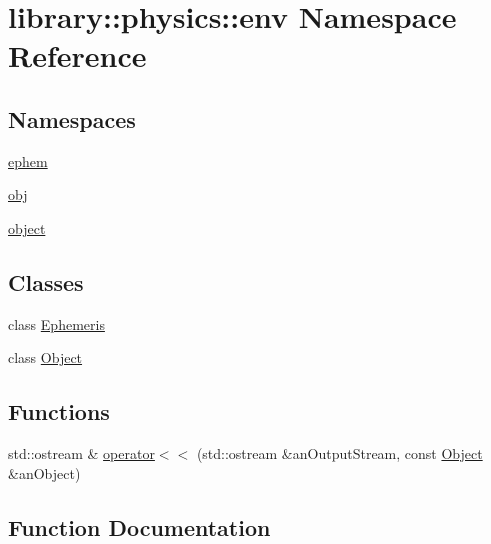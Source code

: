 \hypertarget{namespacelibrary_1_1physics_1_1env}{}\section{library\+:\+:physics\+:\+:env Namespace Reference}
\label{namespacelibrary_1_1physics_1_1env}
\subsection*{Namespaces}
\begin{DoxyCompactItemize}
\item 
 \hyperlink{namespacelibrary_1_1physics_1_1env_1_1ephem}{ephem}
\item 
 \hyperlink{namespacelibrary_1_1physics_1_1env_1_1obj}{obj}
\item 
 \hyperlink{namespacelibrary_1_1physics_1_1env_1_1object}{object}
\end{DoxyCompactItemize}
\subsection*{Classes}
\begin{DoxyCompactItemize}
\item 
class \hyperlink{classlibrary_1_1physics_1_1env_1_1_ephemeris}{Ephemeris}
\item 
class \hyperlink{classlibrary_1_1physics_1_1env_1_1_object}{Object}
\end{DoxyCompactItemize}
\subsection*{Functions}
\begin{DoxyCompactItemize}
\item 
std\+::ostream \& \hyperlink{namespacelibrary_1_1physics_1_1env_ac884c1af7d9475081d42a05bdd59ac3a}{operator$<$$<$} (std\+::ostream \&an\+Output\+Stream, const \hyperlink{classlibrary_1_1physics_1_1env_1_1_object}{Object} \&an\+Object)
\end{DoxyCompactItemize}


\subsection{Function Documentation}
\mbox{\label{namespacelibrary_1_1physics_1_1env_ac884c1af7d9475081d42a05bdd59ac3a}} 
